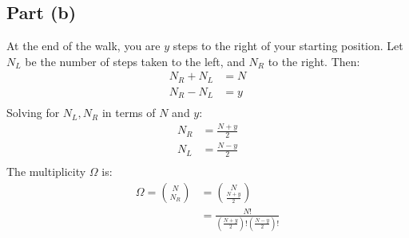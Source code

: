 \documentclass{article}
\begin{document}
\subsection*{Part (b)}
At the end of the walk, you are $y$ steps to the right of your starting position. Let $N_L$ be the number of steps taken to the left, and $N_R$ to the right. Then:
\begin{equation}
    \begin{split}
        N_R + N_L & = N \\
        N_R - N_L & = y \\
    \end{split}
\end{equation}
Solving for $N_L, N_R$ in terms of $N$ and $y$:
\begin{equation}
    \begin{split}
        N_R & = \frac{N + y}{2} \\
        N_L & = \frac{N - y}{2} \\
    \end{split}
\end{equation}
The multiplicity $\Omega$ is:
\begin{equation}
    \begin{split}
        \Omega = {N \choose N_R} & = {N \choose \frac{N + y}{2}} \\
        & = \frac{N!}{(\frac{N + y}{2})!(\frac{N - y}{2})!} \\
    \end{split}
\end{equation}
\end{document}
